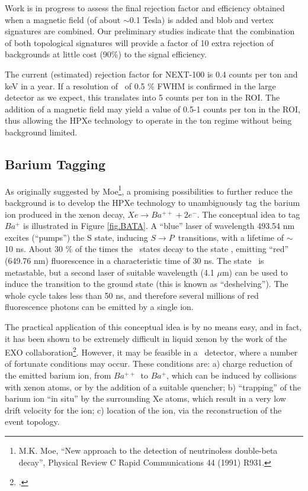  Work is in progress to assess the final rejection factor and efficiency obtained when a magnetic field (of about $\sim$0.1 Tesla) is added and blob and vertex signatures are combined. Our preliminary studies indicate that the combination of both topological signatures will provide a factor of 10 extra rejection of backgrounds at little cost (90\%) 
 to the signal efficiency.  
 
 The current (estimated) rejection factor for NEXT-100 is 0.4 counts per ton and keV in a year. If a resolution of \Qbb\ of 0.5 \% FWHM is confirmed in the large detector as we expect, this translates into 5 counts per ton in the ROI. The addition of a magnetic field may yield a value of 0.5-1 counts per ton in the ROI, thus allowing the HPXe technology to operate in the ton regime without being background limited. 

\subsection{Barium Tagging}

As originally suggested by Moe\footnote{M.K. Moe, ``New approach to the detection of neutrinoless double-beta decay'', Physical Review C Rapid Communications 44 (1991) R931.}, a promising possibilities to further reduce the background is to develop the HPXe technology to unambiguously tag the barium ion produced in the xenon decay, $Xe \rightarrow Ba^{++} + 2 e^-$. The conceptual idea to tag $Ba^{+}$ is illustrated in Figure \ref{fig.BATA}. A ``blue'' laser of wavelength 493.54 nm excites (``pumps'') the S state, inducing $S \rightarrow P$~transitions, with a lifetime of $\sim$ 10 ns. About 30 \% of the times the \TwoP\ states decay to the state \TwoD, emitting ``red'' (649.76 nm) fluorescence in a characteristic time of 30 ns. The state \TwoD\ is metastable, but a second laser of suitable wavelength (4.1 $\mu$m) can be used to induce the transition to the ground state (this is known as ``deshelving'').  The whole cycle takes less than 50 ns, and therefore several millions of red fluorescence photons can be emitted by a single ion. 

The practical application of this conceptual idea is by no means easy, and in fact, it has been shown to be extremely difficult in liquid xenon by the work of the EXO collaboration\footcite{Dolinski:2012dta}. However, it may be feasible in a \HPXE\ detector, where a number of fortunate conditions may occur. These conditions are: a) charge reduction of the emitted barium ion, from $Ba^{++}$~to $Ba^{+}$, which can be induced by collisions with xenon atoms, or by the addition of a suitable quencher; b) ``trapping'' of the barium ion ``in situ'' by the surrounding Xe atoms, which result in a very low drift velocity for the ion; c) location of the ion, via the reconstruction of the event topology. 


